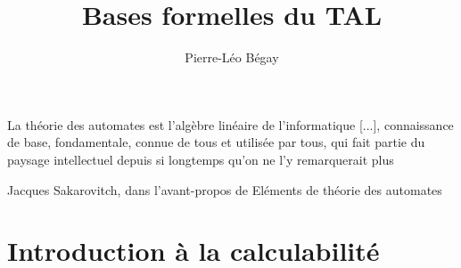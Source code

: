 \documentclass{report}
\title{Bases formelles du TAL}
\author{Pierre-Léo Bégay}
\theoremstyle{slanted}
\begin{document}
\maketitle

\epigraph{La théorie des automates est l'algèbre linéaire de l'informatique [...], connaissance de base, fondamentale, connue de tous et utilisée par tous, qui fait partie du paysage intellectuel depuis si longtemps qu'on ne l'y remarquerait plus}{Jacques Sakarovitch, dans l'avant-propos de Eléments de théorie des automates}

\tableofcontents







%
\chapter{Introduction à la calculabilité}






\appendix


\end{document}
